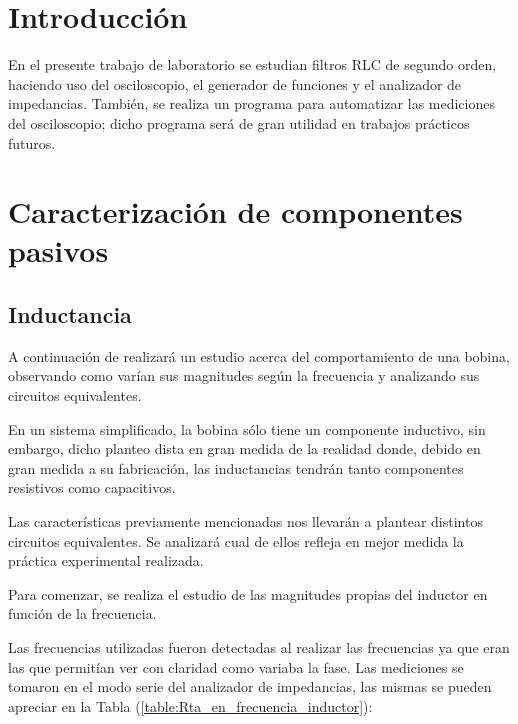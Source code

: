 \documentclass[11pt, a4paper]{article}
\begin{document}




\section{Introducción}
En el presente trabajo de laboratorio se estudian filtros RLC de segundo orden, haciendo uso del osciloscopio, el generador de funciones y el analizador de impedancias. También, se realiza un programa para automatizar las mediciones del osciloscopio; dicho programa será de gran utilidad en trabajos prácticos futuros.

\section{Caracterización de componentes pasivos}

\subsection{Inductancia}
A continuación de realizará un estudio acerca del comportamiento de una bobina, observando como varían sus magnitudes según la frecuencia y analizando sus circuitos equivalentes.\par En un sistema simplificado, la bobina sólo tiene un componente inductivo, sin embargo, dicho planteo dista en gran medida de la realidad donde, debido en gran medida a su fabricación, las inductancias tendrán tanto componentes resistivos como capacitivos. \par Las características previamente mencionadas nos llevarán a plantear distintos circuitos equivalentes. Se analizará cual de ellos refleja en mejor medida la práctica experimental realizada.

Para comenzar, se realiza el estudio de las magnitudes propias del inductor en función de la frecuencia. \par Las frecuencias utilizadas fueron detectadas al realizar las frecuencias ya que eran las que permitían ver con claridad como variaba la fase. Las mediciones se tomaron en el modo serie del analizador de impedancias, las mismas se pueden apreciar en la Tabla (\ref{table:Rta_en_frecuencia_inductor}):
\end{document}

